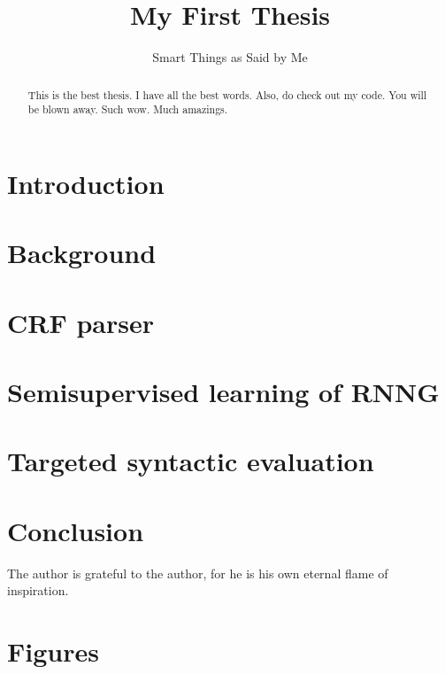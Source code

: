 \documentclass[examplefnt,biber]{../src/nowfnt} %
\title{My First Thesis}
\subtitle{Smart Things as Said by Me}
\begin{document}
\makeabstracttitle

\begin{abstract}
This is the best thesis. I have all the best words. Also, do check out my code. You will be blown away. Such wow. Much amazings.

\end{abstract}


\chapter{Introduction}
\label{01-introduction}



\chapter{Background}
\label{02-background}



\chapter{CRF parser}
\label{04-crf}



\chapter{Semisupervised learning of RNNG}
\label{05-semisupervised}



\chapter{Targeted syntactic evaluation}
\label{06-syneval}



\chapter{Conclusion}
\label{07-conclusion}




\begin{acknowledgements}
The author is grateful to the author, for he is his own eternal flame of inspiration.
\end{acknowledgements}

\appendix
\chapter{Figures}
\label{App:journalcodes}

\backmatter  %

\printbibliography
\end{document}
